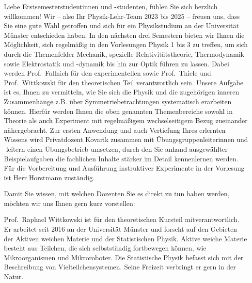 \begin{multicols}{2}
Liebe Erstsemesterstudentinnen und -studenten, fühlen Sie sich herzlich willkommen! Wir -- also Ihr Physik-Lehr-Team 2023 bis 2025 -- freuen uns, dass Sie eine gute Wahl getroffen und sich für ein Physikstudium an der Universität Münster entschieden haben. In den nächsten drei Semestern bieten wir Ihnen die Möglichkeit, sich regelmä{\ss}ig in den Vorlesungen Physik 1 bis 3 zu treffen, um sich durch die Themenfelder Mechanik, spezielle Relativitätstheorie, Thermodynamik sowie Elektrostatik und -dynamik bis hin zur Optik führen zu lassen. Dabei werden Prof.\ Fallnich für den experimentellen sowie Prof.\ Thiele und Prof.\ Wittkowski für den theoretischen Teil verantwortlich sein. Unsere Aufgabe ist es, Ihnen zu vermitteln, wie Sie sich die Physik und die zugehörigen inneren Zusammenhänge z.B. über Symmetriebetrachtungen systematisch erarbeiten können. Hierfür werden Ihnen die oben genannten Themenbereiche sowohl in Theorie als auch Experiment mit regelmä{\ss}igem wechselseitigem Bezug zueinander nähergebracht. Zur ersten Anwendung und auch Vertiefung Ihres erlernten Wissens wird Privatdozent Kovarik zusammen mit Übungs\-gruppen\-leiter\-innen und -leitern einen Übungsbetrieb umsetzen, durch den Sie anhand ausgewählter Beispielaufgaben die fachlichen Inhalte stärker im Detail kennenlernen werden. Für die Vorbereitung und Ausführung instruktiver Experimente in der Vorlesung ist Herr Horstmann zuständig.

Damit Sie wissen, mit welchen Dozenten Sie es direkt zu tun haben werden, möchten wir uns Ihnen gern kurz vorstellen:

Prof.\ Raphael Wittkowski ist für den theoretischen Kursteil mitverantwortlich. Er arbeitet seit 2016 an der Universität Münster und forscht auf den Gebieten der Aktiven weichen Materie und der Statistischen Physik. Aktive weiche Materie besteht aus Teilchen, die sich selbstständig fortbewegen können, wie Mikroorganismen und Mikroroboter. Die Statistische Physik befasst sich mit der Beschreibung von Vielteilchensystemen. Seine Freizeit verbringt er gern in der Natur.


\end{multicols}
